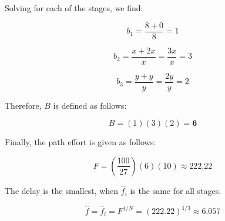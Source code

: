\documentclass[fleqn]{article}
\begin{document}
\begin{enumerate}
\begin{enumerate}
				Solving for each of the stages, we find:
				
				\begin{equation*}
					b_1 = \frac{8 + 0}{8} = 1
				\end{equation*}
				
				\begin{equation*}
					b_2 = \frac{x + 2x}{x} = \frac{3x}{x} = 3
				\end{equation*}
				
				\begin{equation*}
					b_3 = \frac{y + y}{y} = \frac{2y}{y} = 2
				\end{equation*}
				
				Therefore, $B$ is defined as follows:
				
				\begin{equation*}
					B = (1)(3)(2) = \mathbf{6}
				\end{equation*}
				
				Finally, the path effort is given as follows:
				
				\begin{equation*}
					F = \left(\frac{100}{27}\right)\left(6\right)\left(10\right) \approx \mathbf{222.22}
				\end{equation*}
				
				The delay is the smallest, when $\hat{f}_i$ is the same for all stages.
				
				\begin{equation*}
					\hat{f} = \hat{f}_i = F^{1/N} = (222.22)^{1/3} \approx \mathbf{6.057}
				\end{equation*}
			\end{enumerate}
	\end{enumerate}
\end{document}
